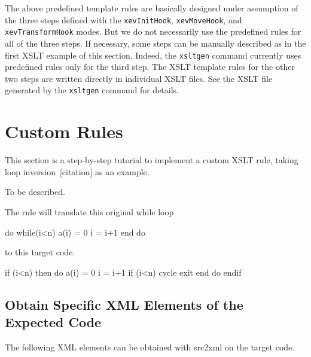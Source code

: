The above predefined template rules are basically designed under
assumption of the three steps defined with the \texttt{xevInitHook},
\texttt{xevMoveHook}, and \texttt{xevTransformHook} modes. But we do not
necessarily use the predefined rules for all of the three steps.  If
necessary, some steps can be manually described as in the first XSLT
example of this section. Indeed, the \texttt{xsltgen} command currently
uses predefined rules only for the third step.  The XSLT template rules
for the other two steps are written directly in individual XSLT
files. See the XSLT file generated by the \texttt{xsltgen} command for
details.

\section{Custom Rules}\label{sec:custom}


This section is a step-by-step tutorial to implement a custom XSLT rule,
taking loop inversion~[citation] as an example.

To be described.

\iffalse

The rule will translate this original while loop
\begin{framed}
\begin{src}
    do while(i<n)
        a(i) = 0
        i = i+1
    end do
\end{src}
\end{framed}

to this target code.

\begin{framed}
\begin{src}
    if (i<n) then
        do
            a(i) = 0
            i = i+1
            if  (i<n)  cycle
            exit
        end do
    endif
\end{src}
\end{framed}



\subsection{Obtain Specific XML Elements of the Expected Code}

The following XML elements can be obtained with src2xml on the target code.

